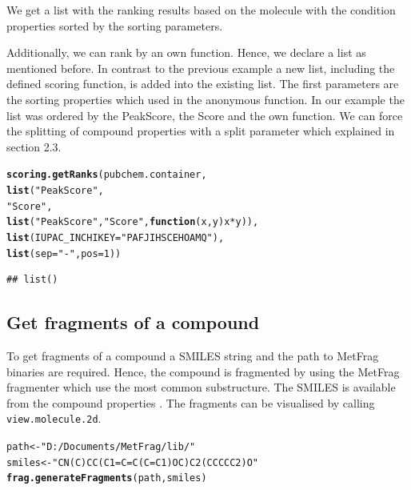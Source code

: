 \documentclass[12pt, a4paper]{scrartcl}\usepackage[]{graphicx}\usepackage[]{color}
\makeatletter
\newcommand{\hlnum}[1]{\textcolor[rgb]{0.686,0.059,0.569}{#1}}%
\newcommand{\hlstr}[1]{\textcolor[rgb]{0.192,0.494,0.8}{#1}}%
\newcommand{\hlopt}[1]{\textcolor[rgb]{0,0,0}{#1}}%
\newcommand{\hlstd}[1]{\textcolor[rgb]{0.345,0.345,0.345}{#1}}%
\newcommand{\hlkwa}[1]{\textcolor[rgb]{0.161,0.373,0.58}{\textbf{#1}}}%
\newcommand{\hlkwb}[1]{\textcolor[rgb]{0.69,0.353,0.396}{#1}}%
\newcommand{\hlkwc}[1]{\textcolor[rgb]{0.333,0.667,0.333}{#1}}%
\newcommand{\hlkwd}[1]{\textcolor[rgb]{0.737,0.353,0.396}{\textbf{#1}}}%
\newenvironment{kframe}{%
 \def\at@end@of@kframe{}%
 \ifinner\ifhmode%
  \def\at@end@of@kframe{\end{minipage}}%
  \begin{minipage}{\columnwidth}%
 \fi\fi%
 \def\FrameCommand##1{\hskip\@totalleftmargin \hskip-\fboxsep
 \colorbox{shadecolor}{##1}\hskip-\fboxsep
     \hskip-\linewidth \hskip-\@totalleftmargin \hskip\columnwidth}%
 \MakeFramed {\advance\hsize-\width
   \@totalleftmargin\z@ \linewidth\hsize
   \@setminipage}}%
 {\par\unskip\endMakeFramed%
 \at@end@of@kframe}
\newenvironment{knitrout}{}{} %
\newcommand{\Rfunction}[1]{{\texttt{#1}}}
\makeatother
\begin{document}
We get a list with the ranking results based on the molecule with the condition properties
sorted by the sorting parameters.

\newpage
Additionally, we can rank by an own function. Hence, we declare a list as mentioned before.
In contrast to the previous example a new list, including the defined scoring function, is added into the existing list.
The first parameters are the sorting properties which used in the anonymous function. In our example the list was ordered by the PeakScore, the Score and the own function. We can force the splitting of compound properties with a split parameter which explained in section 2.3.
\begin{knitrout}
\color{fgcolor}\begin{kframe}
\begin{alltt}
  \hlkwd{scoring.getRanks}\hlstd{(pubchem.container,}
                   \hlkwd{list}\hlstd{(}\hlstr{"PeakScore"}\hlstd{,}
                        \hlstr{"Score"}\hlstd{,}
                        \hlkwd{list}\hlstd{(}\hlstr{"PeakScore"}\hlstd{,} \hlstr{"Score"}\hlstd{,} \hlkwa{function}\hlstd{(}\hlkwc{x}\hlstd{,} \hlkwc{y}\hlstd{) x}\hlopt{*}\hlstd{y)),}
                   \hlkwd{list}\hlstd{(}\hlkwc{IUPAC_INCHIKEY}\hlstd{=}\hlstr{"PAFJIHSCEHOAMQ"}\hlstd{),}
                   \hlkwd{list}\hlstd{(}\hlkwc{sep}\hlstd{=}\hlstr{"-"}\hlstd{,} \hlkwc{pos}\hlstd{=}\hlnum{1}\hlstd{))}
\end{alltt}
\begin{verbatim}
## list()
\end{verbatim}
\end{kframe}
\end{knitrout}

\subsection{Get fragments of a compound}
To get fragments of a compound a SMILES string and the path to MetFrag binaries 
are required. Hence, the compound is fragmented by using the MetFrag fragmenter which use
the most common substructure. The SMILES is available from the compound properties \cite{Wolf2010}.
The fragments can be visualised by calling \Rfunction{view.molecule.2d}.
\begin{knitrout}
\color{fgcolor}\begin{kframe}
\begin{alltt}
  \hlstd{path} \hlkwb{<-} \hlstr{"D:/Documents/MetFrag/lib/"}
  \hlstd{smiles} \hlkwb{<-} \hlstr{"CN(C)CC(C1=C=C(C=C1)OC)C2(CCCCC2)O"}
  \hlkwd{frag.generateFragments}\hlstd{(path, smiles)}
\end{alltt}
\end{kframe}
\end{knitrout}
\end{document}
